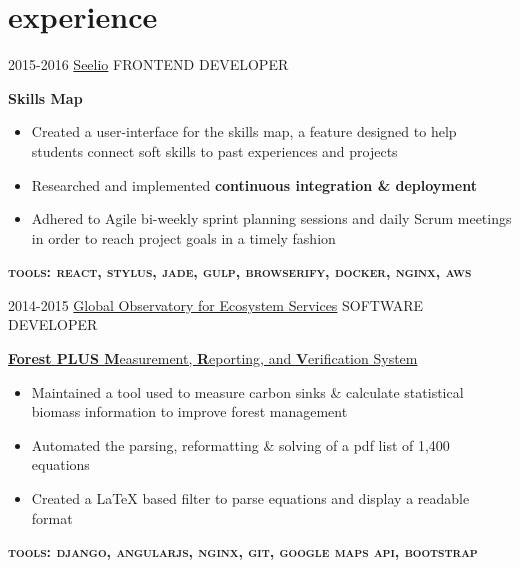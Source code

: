 \documentclass[]{friggeri-cv}
\begin{document}
\section{experience}

\begin{entrylist}
\entry
  {2015-2016}
  {\href{http://www.seelio.com/}{Seelio} }
  {FRONTEND DEVELOPER}
  {
   \textcolor{gray}{\FA \faMapMarker} \hspace{2pt} {\bf Skills Map}
   \begin{itemize}[topsep=6pt,leftmargin=0pt,itemsep=6pt]
     \item Created a user-interface for the skills map, a feature designed
       to help students connect soft skills to past experiences and projects
     \item {
         Researched and implemented {\bfseries continuous integration \& deployment} %
       }
     \item Adhered to Agile bi-weekly sprint planning sessions and daily 
       Scrum meetings in order to reach project goals in a timely fashion
   \end{itemize}
   \textsc{\textbf{tools: react, stylus, jade, gulp, browserify, docker, nginx, aws}}
   \vspace{10pt}
  }

  \entry
    {2014-2015}
    {
        \href{https://goes.msu.edu/index.cfm}{Global Observatory for Ecosystem Services}
    }
    {SOFTWARE DEVELOPER}
    {
      \textcolor{gray}{\FA \faLeaf} \hspace{2pt} \href{http://www.forestplus.org/}
      {{\bf Forest PLUS M}easurement, {\bf R}eporting, and {\bf V}erification System }
      
      \begin{itemize}[topsep=6pt,leftmargin=0pt,itemsep=6pt]
          \item{
            Maintained a tool used to measure carbon sinks \& calculate
            statistical biomass information to improve forest management
          }
          \item{ Automated the parsing, reformatting \& solving of a pdf list of 
            1,400 equations
          } 
          \item{
            Created a LaTeX based filter to parse equations and display a readable format
          }
      \end{itemize}
      \textsc{\textbf{tools: django, angularjs, nginx, git, google maps api, bootstrap}}
      \vspace{10pt}
    }
  

\end{entrylist}
\end{document}
